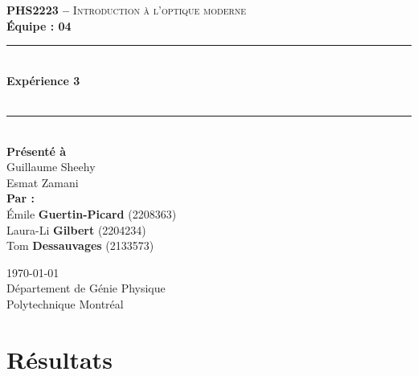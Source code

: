 \documentclass[11pt,letterpaper]{article}
\begin{document}
\begin{titlepage}
\center

\begin{figure}
\end{figure}
\vspace*{2 cm}

\textsc{\Large \textbf{PHS2223 --} Introduction à l'optique moderne}\\[0.5cm]
\large{\textbf{Équipe : 04}}\\[1.5cm]

\rule{\linewidth}{0.5mm} \\[0.5cm]
\Large{\textbf{Expérience 3}} \\[0.2cm]
\\
\rule{\linewidth}{0.2mm} \\[2.3cm]

\large{\textbf{Présenté à}\\
  Guillaume Sheehy\\
  Esmat Zamani\\[2.5cm]
  \textbf{Par :}\\
  Émile \textbf{Guertin-Picard} (2208363)\\
  Laura-Li \textbf{Gilbert} (2204234)\\
  Tom \textbf{Dessauvages} (2133573)\\[3cm]}

\large{\today\\
Département de Génie Physique\\
Polytechnique Montréal\\}

\end{titlepage}


\tableofcontents
{}
\newpage

\pagestyle{fancy}
\setlength{\headheight}{14pt}
\renewcommand{\headrulewidth}{0pt}
\fancyfoot[R]{\thepage}

\pagestyle{fancy}
\fancyhf{}
\renewcommand{\headrulewidth}{1pt}
\fancyhead[R]{\today}
\fancyfoot[R]{\thepage}

\setcounter{page}{1}


\section{Résultats}
\end{document}
